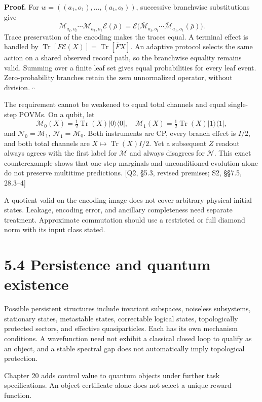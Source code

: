 \documentclass[
  11pt,
  oneside]{book}
\begin{document}
\textbf{Proof.} For \(w=((a_1,o_1),\ldots,(a_t,o_t))\), successive
branchwise substitutions give \[
\mathcal M_{a_t,o_t}\cdots\mathcal M_{a_1,o_1}\mathcal E(\bar\rho)
=\mathcal E\bigl(\overline{\mathcal M}_{a_t,o_t}\cdots
\overline{\mathcal M}_{a_1,o_1}(\bar\rho)\bigr).
\] Trace preservation of the encoding makes the traces equal. A terminal
effect is handled by
\(\operatorname{Tr}[F\mathcal E(X)]=\operatorname{Tr}[\bar F X]\). An
adaptive protocol selects the same action on a shared observed record
path, so the branchwise equality remains valid. Summing over a finite
leaf set gives equal probabilities for every leaf event.
Zero-probability branches retain the zero unnormalized operator, without
division. \(\square\)

The requirement cannot be weakened to equal total channels and equal
single-step POVMs. On a qubit, let \[
\mathcal M_0(X)=\tfrac12\operatorname{Tr}(X)|0\rangle\langle0|,
\quad\mathcal M_1(X)=\tfrac12\operatorname{Tr}(X)|1\rangle\langle1|,
\] and \(\mathcal N_0=\mathcal M_1,\ \mathcal N_1=\mathcal M_0\). Both
instruments are CP, every branch effect is \(I/2\), and both total
channels are \(X\mapsto\operatorname{Tr}(X)I/2\). Yet a subsequent \(Z\)
readout always agrees with the first label for \(\mathcal M\) and always
disagrees for \(\mathcal N\). This exact counterexample shows that
one-step marginals and unconditioned evolution alone do not preserve
multitime predictions. {[}Q2, §5.3, revised premises; S2, §§7.5,
28.3--4{]}

A quotient valid on the encoding image does not cover arbitrary physical
initial states. Leakage, encoding error, and ancillary completeness need
separate treatment. Approximate commutation should use a restricted or
full diamond norm with its input class stated.

\section{5.4 Persistence and quantum existence}

Possible persistent structures include invariant subspaces, noiseless
subsystems, stationary states, metastable states, correctable logical
states, topologically protected sectors, and effective quasiparticles.
Each has its own mechanism conditions. A wavefunction need not exhibit a
classical closed loop to qualify as an object, and a stable spectral gap
does not automatically imply topological protection.

Chapter 20 adds control value to quantum objects under further task
specifications. An object certificate alone does not select a unique
reward function.
\end{document}
